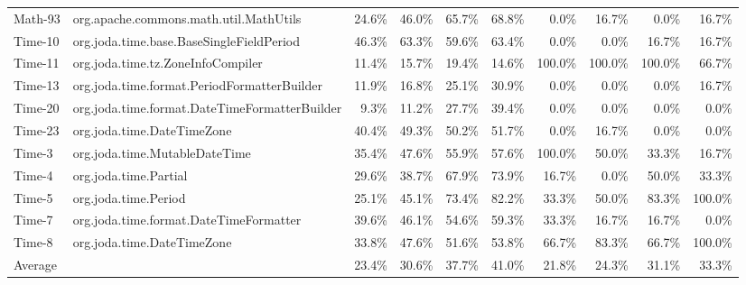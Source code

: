 \begin{tabular}{ ll rrrr rrrr}
Math-93 &  org.apache.commons.math.util.MathUtils &  24.6\% &  46.0\% &  65.7\% &  68.8\% &  0.0\% &  16.7\% &  0.0\% &  16.7\%\\ 
Time-10 &  org.joda.time.base.BaseSingleFieldPeriod &  46.3\% &  63.3\% &  59.6\% &  63.4\% &  0.0\% &  0.0\% &  16.7\% &  16.7\%\\ 
Time-11 &  org.joda.time.tz.ZoneInfoCompiler &  11.4\% &  15.7\% &  19.4\% &  14.6\% &  100.0\% &  100.0\% &  100.0\% &  66.7\%\\ 
Time-13 &  org.joda.time.format.PeriodFormatterBuilder &  11.9\% &  16.8\% &  25.1\% &  30.9\% &  0.0\% &  0.0\% &  0.0\% &  16.7\%\\ 
Time-20 &  org.joda.time.format.DateTimeFormatterBuilder &  9.3\% &  11.2\% &  27.7\% &  39.4\% &  0.0\% &  0.0\% &  0.0\% &  0.0\%\\ 
Time-23 &  org.joda.time.DateTimeZone &  40.4\% &  49.3\% &  50.2\% &  51.7\% &  0.0\% &  16.7\% &  0.0\% &  0.0\%\\ 
Time-3 &  org.joda.time.MutableDateTime &  35.4\% &  47.6\% &  55.9\% &  57.6\% &  100.0\% &  50.0\% &  33.3\% &  16.7\%\\ 
Time-4 &  org.joda.time.Partial &  29.6\% &  38.7\% &  67.9\% &  73.9\% &  16.7\% &  0.0\% &  50.0\% &  33.3\%\\ 
Time-5 &  org.joda.time.Period &  25.1\% &  45.1\% &  73.4\% &  82.2\% &  33.3\% &  50.0\% &  83.3\% &  100.0\%\\ 
Time-7 &  org.joda.time.format.DateTimeFormatter &  39.6\% &  46.1\% &  54.6\% &  59.3\% &  33.3\% &  16.7\% &  16.7\% &  0.0\%\\ 
Time-8 &  org.joda.time.DateTimeZone &  33.8\% &  47.6\% &  51.6\% &  53.8\% &  66.7\% &  83.3\% &  66.7\% &  100.0\%\\ 
\midrule 
Average &  &  23.4\% &  30.6\% &  37.7\% &  41.0\% &  21.8\% &  24.3\% &  31.1\% &  33.3\%\\ 
\bottomrule 
\end{tabular} 

